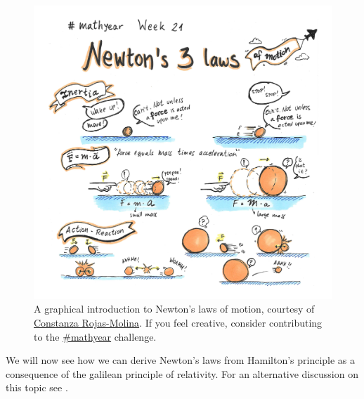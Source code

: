 \documentclass[english,fontsize=11pt,paper=b5]{scrbook}
\theoremstyle{definition}
\begin{document}
    \begin{figure}[ht]
      \centering
      \includegraphics[width=.85\linewidth]{images/coni-mathyear-21-21.jpg}
      \caption{A graphical introduction to Newton's laws of motion,
        courtesy of \href{https://web.archive.org/web/20210602092955/https://twitter.com/Coni777/status/1399953219997032448}{Constanza Rojas-Molina}.
        If you feel creative, consider contributing to the
      \href{http://crojasmolina.com/illustration/the-mathyear-challenge/list-of-prompts-for-mathyear/}{\#mathyear} challenge.}
    \end{figure}

    We will now see how we can derive Newton's laws from Hamilton's principle as a consequence of the galilean principle of relativity. For an alternative discussion on this topic see \cite[Chapters 1.1 and 1.2]{book:arnold}.
\end{document}
